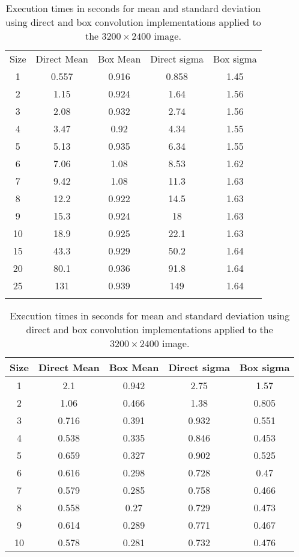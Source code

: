 \documentclass[a4paper]{InsightArticle}
\begin{document}
\begin{table}[phtb]
\centering
\small
\begin{tabular}{ccccc}
\hline
Size  &  Direct Mean &  Box Mean & Direct sigma & Box sigma\\
1	&	0.557	&	0.916	&	0.858	&	1.45	 \\
2	&	1.15	&	0.924	&	1.64	&	1.56	 \\
3	&	2.08	&	0.932	&	2.74	&	1.56	 \\
4	&	3.47	&	0.92	&	4.34	&	1.55	 \\
5	&	5.13	&	0.935	&	6.34	&	1.55	 \\
6	&	7.06	&	1.08	&	8.53	&	1.62	 \\
7	&	9.42	&	1.08	&	11.3	&	1.63	 \\
8	&	12.2	&	0.922	&	14.5	&	1.63	 \\
9	&	15.3	&	0.924	&	18	&	1.63	 \\
10	&	18.9	&	0.925	&	22.1	&	1.63	 \\
15	&	43.3	&	0.929	&	50.2	&	1.64	 \\
20	&	80.1	&	0.936	&	91.8	&	1.64	 \\
25	&	131	&	0.939	&	149	&	1.64	 \\
\hline
\hline
\small
\end{tabular}
\caption{Execution times in seconds for mean and standard deviation using direct and box convolution implementations applied to the $3200 \times 2400$ image.\label{tab:perfBoxConv}}
\end{table}


\begin{table}[phtb]
\centering
\small
\begin{tabular}{ccccc}
\hline
Size  &  Direct Mean &  Box Mean & Direct sigma & Box sigma\\
\hline
1	&	2.1	&	0.942	&	2.75	&	1.57	\\
2	&	1.06	&	0.466	&	1.38	&	0.805	\\
3	&	0.716	&	0.391	&	0.932	&	0.551	\\
4	&	0.538	&	0.335	&	0.846	&	0.453	\\
5	&	0.659	&	0.327	&	0.902	&	0.525	\\
6	&	0.616	&	0.298	&	0.728	&	0.47	\\
7	&	0.579	&	0.285	&	0.758	&	0.466	\\
8	&	0.558	&	0.27	&	0.729	&	0.473	\\
9	&	0.614	&	0.289	&	0.771	&	0.467	\\
10	&	0.578	&	0.281	&	0.732	&	0.476	\\
\hline
\hline
\end{tabular}
\caption{Execution times in seconds for mean and standard deviation using direct and box convolution implementations applied to the $3200 \times 2400$ image.\label{tab:perfBoxConv-threads}}
\end{table}
\end{document}
